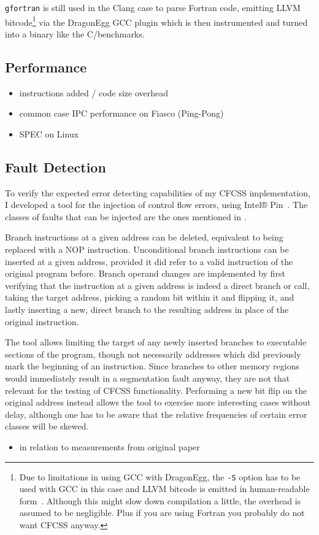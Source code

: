 \texttt{gfortran} is still used in the Clang case to parse Fortran code, emitting LLVM
bitcode\footnote{Due to limitations in using GCC with DragonEgg, the
\texttt{-S} option has to be used with GCC in this case and LLVM bitcode is
emitted in human-readable form~\cite[DragonEgg in action]{dragonegg}. Although
this might slow down compilation a little, the overhead is assumed to be
negligible. Plus if you are using Fortran you probably do not want CFCSS
anyway.} via the DragonEgg GCC plugin \cite{dragonegg} which is then
instrumented and turned into a binary like the C/\CPP benchmarks.

\subsection{Performance}

\begin{itemize}
  \item instructions added / code size overhead
  \item common case IPC performance on Fiasco (Ping-Pong)
  \item SPEC on Linux
\end{itemize}

\subsection{Fault Detection}

To verify the expected error detecting capabilities of my CFCSS implementation,
I developed a tool for the injection of control flow errors, using Intel®
Pin~\cite{intel-pin}. The classes of faults that can be injected are the ones
mentioned in \cite[IV. Simulation Results]{oh-2002-control}.

Branch instructions at a given address can be deleted, equivalent to being
replaced with a NOP instruction. Unconditional branch instructions can be
inserted at a given address, provided it did refer to a valid instruction of
the original program before. Branch operand changes are implemented by first
verifying that the instruction at a given address is indeed a direct branch or
call, taking the target address, picking a random bit within it and flipping
it, and lastly inserting a new, direct branch to the resulting address in place
of the original instruction.

The tool allows limiting the target of any newly inserted branches to
executable sections of the program, though not necessarily addresses which did
previously mark the beginning of an instruction. Since branches to other memory
regions would immediately result in a segmentation fault anyway, they are not
that relevant for the testing of CFCSS functionality. Performing a new bit flip
on the original address instead allows the tool to exercise more interesting
cases without delay, although one has to be aware that the relative frequencies
of certain error classes will be skewed.

\begin{itemize}
  \item in relation to measurements from original paper
\end{itemize}

